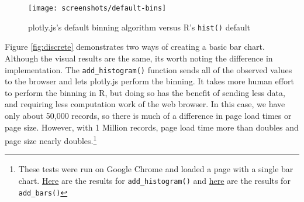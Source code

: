 \documentclass[12pt,]{isuthesis}
\newenvironment{Shaded}{\begin{snugshade}}{\end{snugshade}}
\newcommand{\KeywordTok}[1]{\textcolor[rgb]{0.13,0.29,0.53}{\textbf{{#1}}}}
\newcommand{\DataTypeTok}[1]{\textcolor[rgb]{0.13,0.29,0.53}{{#1}}}
\newcommand{\DecValTok}[1]{\textcolor[rgb]{0.00,0.00,0.81}{{#1}}}
\newcommand{\StringTok}[1]{\textcolor[rgb]{0.31,0.60,0.02}{{#1}}}
\newcommand{\OtherTok}[1]{\textcolor[rgb]{0.56,0.35,0.01}{{#1}}}
\newcommand{\NormalTok}[1]{{#1}}
\let\rmarkdownfootnote\footnote%
\def\footnote{\protect\rmarkdownfootnote}
\begin{document}
\begin{Shaded}
\end{Shaded}

\begin{figure}
\centering
\texttt{[image: screenshots/default-bins]}
\caption{\label{fig:numeric}plotly.js's default binning algorithm versus R's
\texttt{hist()} default}
\end{figure}

Figure \ref{fig:discrete} demonstrates two ways of creating a basic bar
chart. Although the visual results are the same, its worth noting the
difference in implementation. The \texttt{add\_histogram()} function
sends all of the observed values to the browser and lets plotly.js
perform the binning. It takes more human effort to perform the binning
in R, but doing so has the benefit of sending less data, and requiring
less computation work of the web browser. In this case, we have only
about 50,000 records, so there is much of a difference in page load
times or page size. However, with 1 Million records, page load time more
than doubles and page size nearly doubles.\footnote{These tests were run
  on Google Chrome and loaded a page with a single bar chart.
  \href{https://www.webpagetest.org/result/160924_DP_JBX/}{Here} are the
  results for \texttt{add\_histogram()} and
  \href{https://www.webpagetest.org/result/160924_QG_JA1/}{here} are the
  results for \texttt{add\_bars()}}
\end{document}
